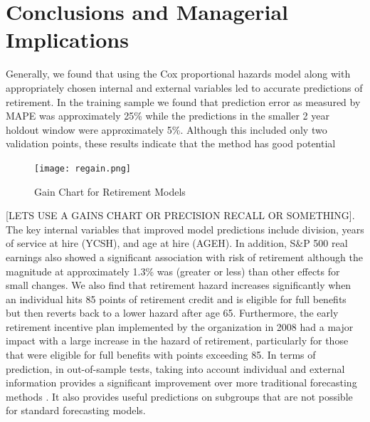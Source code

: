 \documentclass[12pt,letterpaper]{article}
\begin{document}
\section{Conclusions and Managerial Implications}

Generally, we found that using the Cox proportional hazards model along with appropriately chosen internal and external variables led to accurate predictions of retirement.  In the training sample we found that prediction error as measured by MAPE was approximately 25\% while the predictions in the smaller 2 year holdout window were approximately 5\%.  Although this included only two validation points, these results indicate that the method has good potential

 \begin{figure}[htbp]
 	\centering
 	\texttt{[image: regain.png]}
 	\caption{Gain Chart for Retirement Models}
 	\label{fig:regain}
 \end{figure}%
 [LETS USE A GAINS CHART OR PRECISION RECALL OR SOMETHING].
The key internal variables that improved model predictions include division, years of service at hire (YCSH), and age at hire (AGEH).  In addition, S\&P 500 real earnings also showed a significant association with risk of retirement although the magnitude at approximately 1.3\% was (greater or less) than other effects for small changes.  We also find that retirement hazard increases significantly when an individual hits 85 points of retirement credit and is eligible for full benefits but then reverts back to a lower hazard after age 65.  Furthermore, the early retirement incentive plan implemented by the organization in 2008 had a major impact with a large increase in the hazard of retirement, particularly for those that were eligible for full benefits with points exceeding 85.  In terms of prediction, in out-of-sample tests, taking into account individual and external information provides a significant improvement over more traditional forecasting methods \citet{feldman1994}.  It also provides useful predictions on subgroups that are not possible for standard forecasting models.
\end{document}
